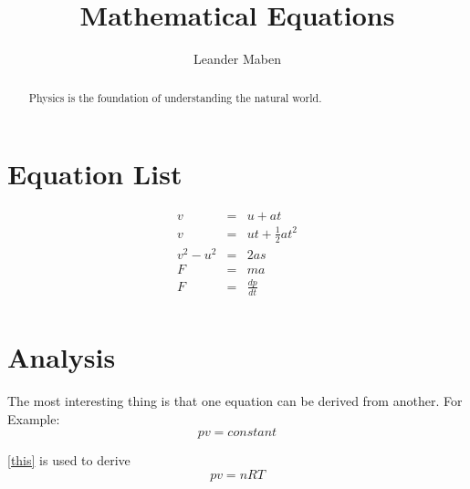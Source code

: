 \documentclass[a4paper,11pt]{article}
\title{Mathematical Equations}
\author{Leander Maben}
\begin{document}
\maketitle
\tableofcontents

\begin{abstract}
Physics is the foundation of understanding the natural world.
\end{abstract}

\section{Equation List}
\begin{eqnarray}
v&=&u+at\\
v&=&ut+\frac{1}{2}at^2\\
v^2-u^2&=&2as\\
F&=&ma\\
F&=&\frac{dp}{dt}\\
\end{eqnarray}
\section{Analysis}
The most interesting thing is that one equation can be derived from another.
For Example:
\begin{equation}
\label{this}
pv=constant
\end{equation}
 
 \ref{this} is used to derive $$pv=nRT$$
\end{document}

